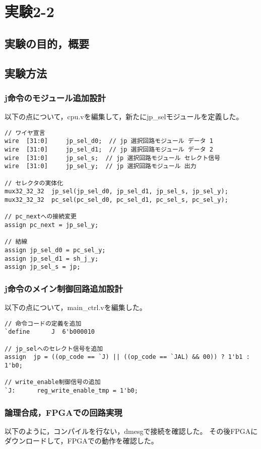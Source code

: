 \section{実験2-2}
\subsection{実験の目的，概要}

\subsection{実験方法}
\subsubsection{j命令のモジュール追加設計}
以下の点について，cpu.vを編集して，新たにjp\_selモジュールを定義した。
\begin{lstlisting}[caption={addiu命令の追加設計},label={addiu命令の追加設計}]
// ワイヤ宣言
wire  [31:0]     jp_sel_d0;  // jp 選択回路モジュール データ 1
wire  [31:0]     jp_sel_d1;  // jp 選択回路モジュール データ 2
wire  [31:0]     jp_sel_s;  // jp 選択回路モジュール セレクト信号
wire  [31:0]     jp_sel_y;  // jp 選択回路モジュール 出力

// セレクタの実体化
mux32_32_32  jp_sel(jp_sel_d0, jp_sel_d1, jp_sel_s, jp_sel_y);
mux32_32_32  pc_sel(pc_sel_d0, pc_sel_d1, pc_sel_s, pc_sel_y);

// pc_nextへの接続変更
assign pc_next = jp_sel_y;

// 結線
assign jp_sel_d0 = pc_sel_y;
assign jp_sel_d1 = sh_j_y;
assign jp_sel_s = jp;
\end{lstlisting}

\subsubsection{j命令のメイン制御回路追加設計}
以下の点について，main\_ctrl.vを編集した。
\begin{lstlisting}[caption={sw命令の追加設計},label={sw命令の追加設計}]
// 命令コードの定義を追加
`define  	 J  6'b000010

// jp_selへのセレクト信号を追加
assign  jp = ((op_code == `J) || ((op_code == `JAL) && 00)) ? 1'b1 : 1'b0;

// write_enable制御信号の追加
`J:      reg_write_enable_tmp = 1'b0;
\end{lstlisting}

\subsubsection{論理合成，FPGAでの回路実現}
以下のように，コンパイルを行ない，dmesgで接続を確認した。
その後FPGAにダウンロードして，FPGAでの動作を確認した。

